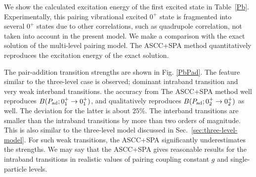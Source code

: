 \documentclass[%
superscriptaddress,
showpacs,
nofootinbib,
amsmath,amssymb,
aps,
prc,
twocolumn,
floatfix ]%
{revtex4-1}
\begin{document}
We show the calculated excitation energy of the first excited state
in Table~\ref{Pb}.
Experimentally, this pairing vibrational excited $0^+$ state is
fragmented into several $0^+$ states due to other correlations,
such as quadrupole correlation, not taken into account in the present model.
We make a comparison with the exact solution of the multi-level
pairing model.
The ASCC+SPA method quantitatively reproduces the excitation energy of
the exact solution.

The pair-addition transition strengths are shown in Fig. \ref{PbPad}.
The feature similar to the three-level case is observed;
dominant intraband transition and very weak interband transitions.
the accuracy from 
The ASCC+SPA method well reproduces
$B(P_{\rm ad};0_1^+\rightarrow 0_1^+)$,
and qualitatively reproduces
$B(P_{\rm ad};0_2^+\rightarrow 0_2^+)$ as well.
The deviation for the latter is about $25\%$.
The interband transitions are smaller than the intraband transitions
by more than two orders of magnitude.
This is also similar to the three-level model discussed
in Sec.~\ref{sec:three-level-model}.
For such weak transitions, the ASCC+SPA significantly
underestimates the strengths.
We may say that the ASCC+SPA gives reasonable results for the intraband
transitions in realistic values of pairing coupling constant $g$ and
single-particle levels.
\end{document}
